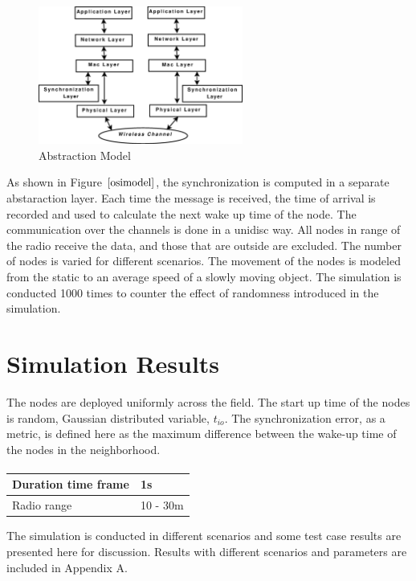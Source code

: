 \documentclass[a4paper,10pt]{report}
\begin{document}
\paragraph*{}
\begin{figure}
\centering
\includegraphics[width=0.6\textwidth]{osimodel}
\caption{Abstraction Model} \label{osimodel}
\end{figure}
As shown in Figure $\ref{osimodel}$, the synchronization is computed in a separate abstaraction layer. Each time the message is received, the time of arrival is recorded and used to calculate the next wake up time of the node. The communication over the channels is done in a unidisc way. All nodes in range of the radio receive the data, and those that are outside are excluded. The number of nodes is varied for different scenarios. The movement of the nodes is modeled from the static to an average speed of a slowly moving object. The simulation is conducted 1000 times to counter the effect of randomness introduced in the simulation.
\section{\textbf{Simulation Results}}
The nodes are deployed uniformly across the field. %
The start up time of the nodes is random, Gaussian distributed variable, $t_{io}$. The synchronization error, as a metric, is defined here as  the maximum difference between the wake-up time of the nodes in the neighborhood.
\paragraph*{}
\begin{center}
    \begin{tabular}{ | l | l |}
    \hline
    Duration time frame & 1s \\ \hline
    Radio range & 10 - 30m \\ \hline
    \end{tabular}
\end{center}
The simulation is conducted in different scenarios and some test case results are presented here for discussion. Results with different scenarios and parameters are included in Appendix A.
\end{document}
